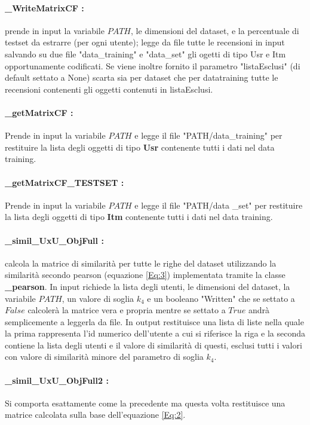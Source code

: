 \documentclass[12pt]{article}
\begin{document}
\paragraph{\_WriteMatrixCF :} prende in input la variabile $PATH$, le dimensioni del dataset, e la percentuale di testset da estrarre (per ogni utente); legge da file tutte le recensioni in input salvando su due file "data\_training" e "data\_set" gli ogetti di tipo Usr e Itm opportunamente codificati. Se viene inoltre fornito il parametro "listaEsclusi" (di default settato a None) scarta sia per dataset che per datatraining tutte le recensioni contenenti gli oggetti contenuti in listaEsclusi.
\paragraph{\_getMatrixCF :}  Prende in input la variabile $PATH$ e legge il file "PATH/data\_training" per restituire la lista degli oggetti di tipo \textbf{Usr} contenente tutti i dati nel data training.
\paragraph{\_getMatrixCF\_TESTSET :}  Prende in input la variabile $PATH$ e legge il file "PATH/data \_set" per restituire la lista degli oggetti di tipo \textbf{Itm} contenente tutti i dati nel data training.

\paragraph{\_simil\_UxU\_ObjFull :} calcola la matrice di similarità per tutte le righe del dataset utilizzando la similarità secondo pearson (equazione \ref{Eq:3}) implementata tramite la classe \textbf{\_pearson}. In input richiede la lista degli utenti, le dimensioni del dataset, la variabile $PATH$, un valore di soglia $k_4$ e un booleano "Written" che se settato a $False$ calcolerà la matrice vera e propria mentre se settato a $True$ andrà semplicemente a leggerla da file. In output restituisce una lista di liste nella quale la prima rappresenta l'id numerico dell'utente a cui si riferisce la riga e la seconda contiene la lista degli utenti e il valore di similarità di questi, esclusi tutti i valori con valore di similarità minore del parametro di soglia $k_4$.
\paragraph{\_simil\_UxU\_ObjFull2 :} Si comporta esattamente come la precedente ma questa volta restituisce una matrice calcolata sulla base dell'equazione \ref{Eq:2}.
\end{document}
